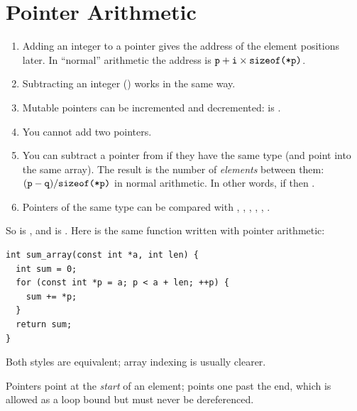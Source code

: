 \section{Pointer Arithmetic}

\begin{enumerate}
  \item Adding an integer  to a pointer  gives the address of the element
     positions later. In ``normal'' arithmetic the address is
    $\texttt{p} + \texttt{i} \times \texttt{sizeof(*p)}$.
  \item Subtracting an integer () works in the same way.
  \item Mutable pointers can be incremented and decremented:  is .
  \item You cannot add two pointers.
  \item You can subtract a pointer  from  if they have the same type (and point
    into the same array). The result is the number of \emph{elements} between them:
    $(\texttt{p} - \texttt{q}) / \texttt{sizeof(*p)}$ in normal arithmetic. In other words, if
     then .
  \item Pointers of the same type can be compared with \code{<}, \code{<=}, \code{==},
    \code{!=}, \code{>=}, \code{>}.
\end{enumerate}

So  is , and  is . Here is the same function
written with pointer arithmetic:
\begin{lstlisting}[style=c]
int sum_array(const int *a, int len) {
  int sum = 0;
  for (const int *p = a; p < a + len; ++p) {
    sum += *p;
  }
  return sum;
}
\end{lstlisting}
Both styles are equivalent; array indexing is usually clearer.
\begin{center}
\end{center}
Pointers point at the \emph{start} of an element;  points one past the end, which is
allowed as a loop bound but must never be dereferenced.


